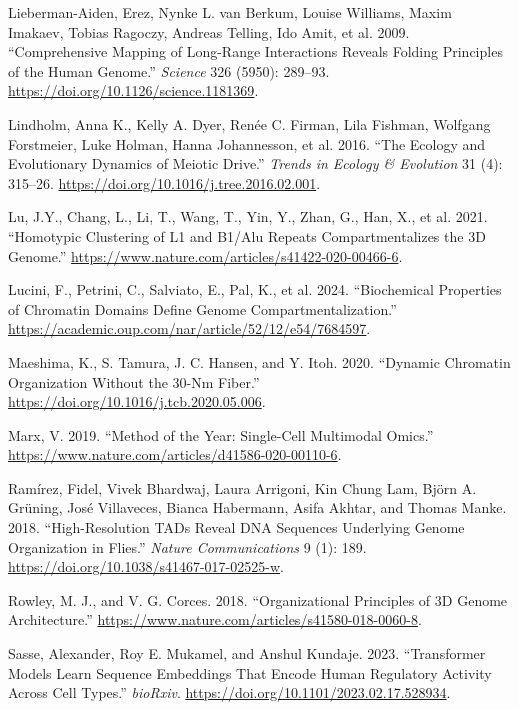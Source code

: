 \documentclass[
  a4paper,
  openany]{scrbook}
\newlength{\cslhangindent}
\newenvironment{CSLReferences}[2] %
 {\begin{list}{}{%
  \setlength{\itemindent}{0pt}
  \setlength{\leftmargin}{0pt}
  \setlength{\parsep}{0pt}
  \ifodd #1
   \setlength{\leftmargin}{\cslhangindent}
   \setlength{\itemindent}{-1\cslhangindent}
  \fi
  \setlength{\itemsep}{#2\baselineskip}}}
 {\end{list}}
\begin{document}
\begin{CSLReferences}{1}{0}
Lieberman-Aiden, Erez, Nynke L. van Berkum, Louise Williams, Maxim
Imakaev, Tobias Ragoczy, Andreas Telling, Ido Amit, et al. 2009.
{``Comprehensive Mapping of Long-Range Interactions Reveals Folding
Principles of the Human Genome.''} \emph{Science} 326 (5950): 289--93.
\url{https://doi.org/10.1126/science.1181369}.

Lindholm, Anna K., Kelly A. Dyer, Renée C. Firman, Lila Fishman,
Wolfgang Forstmeier, Luke Holman, Hanna Johannesson, et al. 2016. {``The
Ecology and Evolutionary Dynamics of Meiotic Drive.''} \emph{Trends in
Ecology \& Evolution} 31 (4): 315--26.
\url{https://doi.org/10.1016/j.tree.2016.02.001}.

Lu, J.Y., Chang, L., Li, T., Wang, T., Yin, Y., Zhan, G., Han, X., et
al. 2021. {``Homotypic Clustering of L1 and B1/Alu Repeats
Compartmentalizes the 3D Genome.''}
\url{https://www.nature.com/articles/s41422-020-00466-6}.

Lucini, F., Petrini, C., Salviato, E., Pal, K., et al. 2024.
{``Biochemical Properties of Chromatin Domains Define Genome
Compartmentalization.''}
\url{https://academic.oup.com/nar/article/52/12/e54/7684597}.

Maeshima, K., S. Tamura, J. C. Hansen, and Y. Itoh. 2020. {``Dynamic
Chromatin Organization Without the 30-Nm Fiber.''}
\url{https://doi.org/10.1016/j.tcb.2020.05.006}.

Marx, V. 2019. {``Method of the Year: Single-Cell Multimodal Omics.''}
\url{https://www.nature.com/articles/d41586-020-00110-6}.

Ramírez, Fidel, Vivek Bhardwaj, Laura Arrigoni, Kin Chung Lam, Björn A.
Grüning, José Villaveces, Bianca Habermann, Asifa Akhtar, and Thomas
Manke. 2018. {``High-Resolution TADs Reveal DNA Sequences Underlying
Genome Organization in Flies.''} \emph{Nature Communications} 9 (1):
189. \url{https://doi.org/10.1038/s41467-017-02525-w}.

Rowley, M. J., and V. G. Corces. 2018. {``Organizational Principles of
3D Genome Architecture.''}
\url{https://www.nature.com/articles/s41580-018-0060-8}.

Sasse, Alexander, Roy E. Mukamel, and Anshul Kundaje. 2023.
{``Transformer Models Learn Sequence Embeddings That Encode Human
Regulatory Activity Across Cell Types.''} \emph{bioRxiv}.
\url{https://doi.org/10.1101/2023.02.17.528934}.


\end{CSLReferences}
\end{document}
